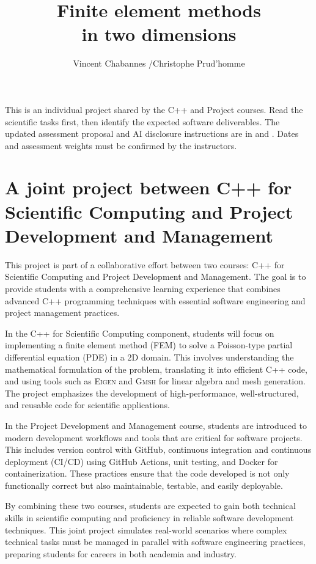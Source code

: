 \documentclass[11pt,a4paper]{article}
\title{Finite element methods\\in two dimensions}
\author{Vincent Chabannes \enspace /\enspace Christophe Prud'homme}
\date{}
\begin{document}
\maketitle
\begin{csminote}
This is an individual project shared by the C++ and Project courses.
Read the scientific tasks first, then identify the expected software deliverables.
The updated assessment proposal and AI disclosure instructions are in
 and .
Dates and assessment weights must be confirmed by the instructors.
\end{csminote}
\tableofcontents
\clearpage


\section*{A joint project between C++ for Scientific Computing and Project Development and Management}

This project is part of a collaborative effort between two courses: C++ for Scientific Computing and Project Development and Management. The goal is to provide students with a comprehensive learning experience that combines advanced C++ programming techniques with essential software engineering and project management practices.

In the C++ for Scientific Computing component, students will focus on implementing a finite element method (FEM) to solve a Poisson-type partial differential equation (PDE) in a 2D domain. This involves understanding the mathematical formulation of the problem, translating it into efficient C++ code, and using tools such as \textsc{Eigen} and \textsc{Gmsh} for linear algebra and mesh generation. The project emphasizes the development of high-performance, well-structured, and reusable code for scientific applications.

In the Project Development and Management course, students are introduced to modern development workflows and tools that are critical for software projects. This includes version control with GitHub, continuous integration and continuous deployment (CI/CD) using GitHub Actions, unit testing, and Docker for containerization. These practices ensure that the code developed is not only functionally correct but also maintainable, testable, and easily deployable.

By combining these two courses, students are expected to gain both technical skills in scientific computing and proficiency in reliable software development techniques. This joint project simulates real-world scenarios where complex technical tasks must be managed in parallel with software engineering practices, preparing students for careers in both academia and industry.
\end{document}
